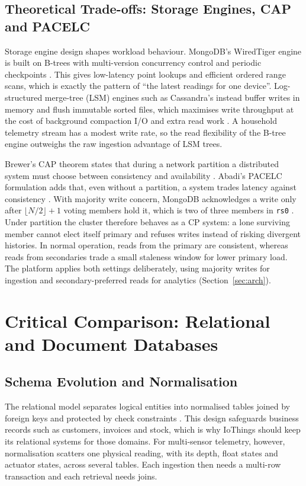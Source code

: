 \documentclass[11pt,a4paper]{article}
\begin{document}
\subsection{Theoretical Trade-offs: Storage Engines, CAP and PACELC}
Storage engine design shapes workload behaviour. MongoDB's WiredTiger engine is built on B-trees with multi-version concurrency control and periodic checkpoints \citep{mongoWT}. This gives low-latency point lookups and efficient ordered range scans, which is exactly the pattern of ``the latest readings for one device''. Log-structured merge-tree (LSM) engines such as Cassandra's instead buffer writes in memory and flush immutable sorted files, which maximises write throughput at the cost of background compaction I/O and extra read work \citep{oneil1996,kleppmann2017}. A household telemetry stream has a modest write rate, so the read flexibility of the B-tree engine outweighs the raw ingestion advantage of LSM trees.

Brewer's CAP theorem states that during a network partition a distributed system must choose between consistency and availability \citep{gilbert2002,brewer2012}. Abadi's PACELC formulation adds that, even without a partition, a system trades latency against consistency \citep{abadi2012}. With majority write concern, MongoDB acknowledges a write only after $\lfloor N/2 \rfloor + 1$ voting members hold it, which is two of three members in \texttt{rs0} \citep{mongoWC}. Under partition the cluster therefore behaves as a CP system: a lone surviving member cannot elect itself primary and refuses writes instead of risking divergent histories. In normal operation, reads from the primary are consistent, whereas reads from secondaries trade a small staleness window for lower primary load. The platform applies both settings deliberately, using majority writes for ingestion and secondary-preferred reads for analytics (Section~\ref{sec:arch}).

\section{Critical Comparison: Relational and Document Databases}

\subsection{Schema Evolution and Normalisation}
The relational model separates logical entities into normalised tables joined by foreign keys and protected by check constraints \citep{codd1970}. This design safeguards business records such as customers, invoices and stock, which is why IoThings should keep its relational systems for those domains. For multi-sensor telemetry, however, normalisation scatters one physical reading, with its depth, float states and actuator states, across several tables. Each ingestion then needs a multi-row transaction and each retrieval needs joins.
\end{document}

